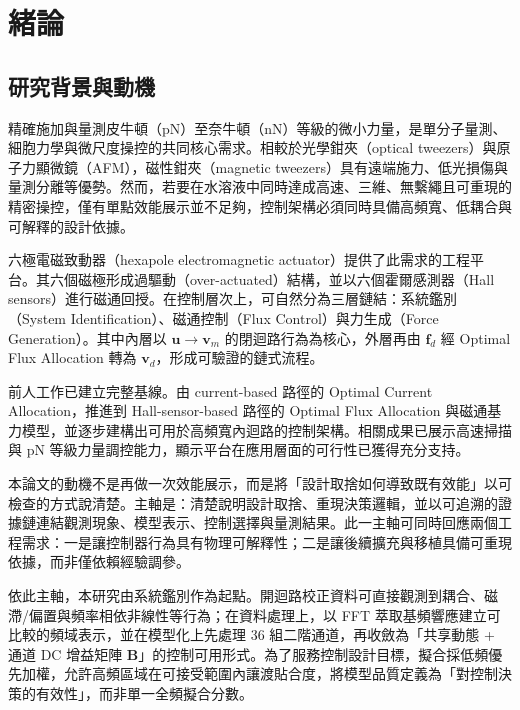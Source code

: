 \chapter{緒論}
\label{c:introduction}

\section{研究背景與動機}
\label{sec:background}

精確施加與量測皮牛頓（pN）至奈牛頓（nN）等級的微小力量，是單分子量測、細胞力學與微尺度操控的共同核心需求。相較於光學鉗夾（optical tweezers）與原子力顯微鏡（AFM），磁性鉗夾（magnetic tweezers）具有遠端施力、低光損傷與量測分離等優勢\cite{ashkin1986observation,binnig1986afm,neuman2008singlemolecule,gosse2002magnetic,devlaminck2012magnetic}。然而，若要在水溶液中同時達成高速、三維、無繫繩且可重現的精密操控，僅有單點效能展示並不足夠，控制架構必須同時具備高頻寬、低耦合與可解釋的設計依據。

六極電磁致動器（hexapole electromagnetic actuator）\cite{zhang2011design}提供了此需求的工程平台。其六個磁極形成過驅動（over-actuated）結構，並以六個霍爾感測器（Hall sensors）進行磁通回授\cite{long2022hallsensor}。在控制層次上，可自然分為三層鏈結：系統鑑別（System Identification）、磁通控制（Flux Control）與力生成（Force Generation）。其中內層以 $\mathbf{u}\!\rightarrow\!\mathbf{v}_m$ 的閉迴路行為為核心，外層再由 $\mathbf{f}_d$ 經 Optimal Flux Allocation 轉為 $\mathbf{v}_d$，形成可驗證的鏈式流程。

前人工作已建立完整基線。由 current-based 路徑的 Optimal Current Allocation，推進到 Hall-sensor-based 路徑的 Optimal Flux Allocation 與磁通基力模型，並逐步建構出可用於高頻寬內迴路的控制架構\cite{long2022hallsensor,meng2023ultraprecise,meng2024piconewton}。相關成果已展示高速掃描與 pN 等級力量調控能力，顯示平台在應用層面的可行性已獲得充分支持。

本論文的動機不是再做一次效能展示，而是將「設計取捨如何導致既有效能」以可檢查的方式說清楚。主軸是：清楚說明設計取捨、重現決策邏輯，並以可追溯的證據鏈連結觀測現象、模型表示、控制選擇與量測結果。此一主軸可同時回應兩個工程需求：一是讓控制器行為具有物理可解釋性；二是讓後續擴充與移植具備可重現依據，而非僅依賴經驗調參。

依此主軸，本研究由系統鑑別作為起點。開迴路校正資料可直接觀測到耦合、磁滯/偏置與頻率相依非線性等行為；在資料處理上，以 FFT 萃取基頻響應建立可比較的頻域表示，並在模型化上先處理 36 組二階通道，再收斂為「共享動態 + 通道 DC 增益矩陣 $\mathbf{B}$」的控制可用形式。為了服務控制設計目標，擬合採低頻優先加權，允許高頻區域在可接受範圍內讓渡貼合度，將模型品質定義為「對控制決策的有效性」，而非單一全頻擬合分數。

